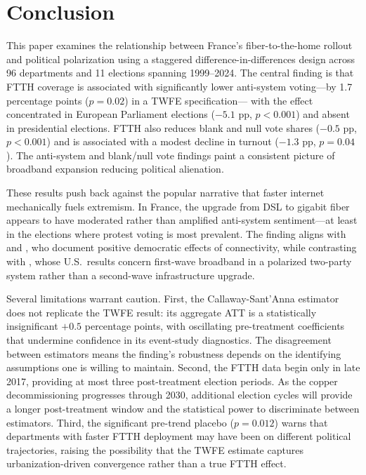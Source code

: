 \documentclass[12pt]{article}
\begin{document}
\section{Conclusion}\label{sec:conclusion}

This paper examines the relationship between France's fiber-to-the-home rollout and political polarization using a staggered difference-in-differences design across 96 departments and 11 elections spanning 1999--2024. The central finding is that FTTH coverage is associated with significantly lower anti-system voting---by 1.7 percentage points ($p = 0.02$) in a TWFE specification--- with the effect concentrated in European Parliament elections ($-5.1$ pp, $p < 0.001$) and absent in presidential elections. FTTH also reduces blank and null vote shares ($-0.5$ pp, $p < 0.001$) and is associated with a modest decline in turnout ($-1.3$ pp, $p = 0.04$). The anti-system and blank/null vote findings paint a consistent picture of broadband expansion reducing political alienation.

These results push back against the popular narrative that faster internet mechanically fuels extremism. In France, the upgrade from DSL to gigabit fiber appears to have moderated rather than amplified anti-system sentiment---at least in the elections where protest voting is most prevalent. The finding aligns with \citet{campante2018long} and \citet{falck2014does}, who document positive democratic effects of connectivity, while contrasting with \citet{lelkes2017hostile}, whose U.S.\ results concern first-wave broadband in a polarized two-party system rather than a second-wave infrastructure upgrade.

Several limitations warrant caution. First, the Callaway-Sant'Anna estimator does not replicate the TWFE result: its aggregate ATT is a statistically insignificant $+0.5$ percentage points, with oscillating pre-treatment coefficients that undermine confidence in its event-study diagnostics. The disagreement between estimators means the finding's robustness depends on the identifying assumptions one is willing to maintain. Second, the FTTH data begin only in late 2017, providing at most three post-treatment election periods. As the copper decommissioning progresses through 2030, additional election cycles will provide a longer post-treatment window and the statistical power to discriminate between estimators. Third, the significant pre-trend placebo ($p = 0.012$) warns that departments with faster FTTH deployment may have been on different political trajectories, raising the possibility that the TWFE estimate captures urbanization-driven convergence rather than a true FTTH effect.
\end{document}
